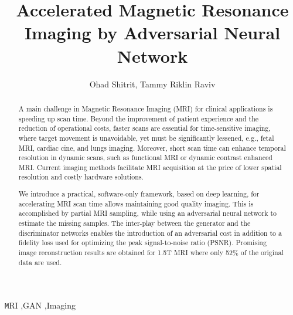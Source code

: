 \documentclass[review]{elsarticle}
\begin{document}
\begin{frontmatter}

\title{Accelerated Magnetic Resonance Imaging by Adversarial Neural Network}

\author{Ohad Shitrit, Tammy Riklin Raviv}
\address{$^1$Department of Electrical Engineering, 
	     $^2$The Zlotowski Center for Neuroscience
	     Ben-Gurion University of the Negev, Israel}

\begin{abstract}
A main challenge in Magnetic Resonance Imaging (MRI) for clinical
applications is speeding up scan time. Beyond the improvement of patient
experience and the reduction of operational costs, faster scans are
essential for time-sensitive imaging, where target movement is unavoidable,
yet must be significantly lessened, e.g., fetal MRI, cardiac cine,
and lungs imaging. Moreover, short scan time can enhance temporal
resolution in dynamic scans, such as functional MRI or dynamic contrast
enhanced MRI. Current imaging methods facilitate MRI acquisition at
the price of lower spatial resolution and costly hardware solutions.

We introduce a practical, software-only framework, based on deep learning,
for accelerating MRI scan time allows maintaining good quality imaging.
This is accomplished by partial MRI sampling, while using an adversarial
neural network to estimate the missing samples. The inter-play between
the generator and the discriminator networks enables the introduction
of an adversarial cost in addition to a fidelity loss used for optimizing
the peak signal-to-noise ratio (PSNR). Promising image reconstruction
results are obtained for 1.5T MRI where only 52\% of the original
data are used. 
\end{abstract}

\begin{keyword}
\texttt MRI \sep GAN \sep Imaging
\end{keyword}

\end{frontmatter}

\linenumbers
\end{document}
